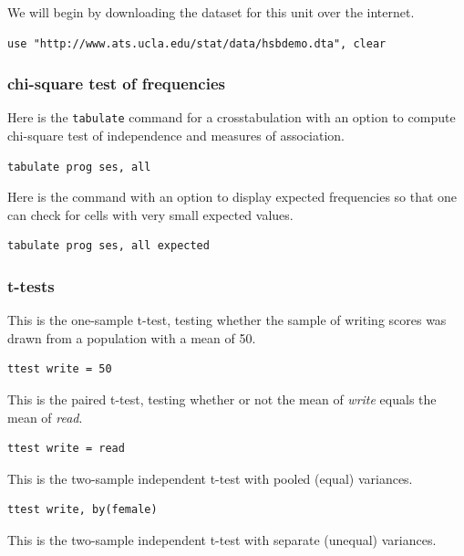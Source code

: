 \documentclass{article}
\begin{document}
We will begin by downloading the dataset for this unit over the internet.

\begin{lstlisting}
use "http://www.ats.ucla.edu/stat/data/hsbdemo.dta", clear
\end{lstlisting}

\subsubsection{chi-square test of frequencies}

Here is the \lstinline{tabulate} command for a crosstabulation with an option to compute chi-square test of independence and measures of association.


\begin{lstlisting}
tabulate prog ses, all
\end{lstlisting}

Here is the command with an option to display expected frequencies so that one can check for cells with very small expected values.

\begin{lstlisting}
tabulate prog ses, all expected
\end{lstlisting}

\subsubsection{t-tests}

This is the one-sample t-test, testing whether the sample of writing scores was drawn from a population with a mean of 50.

\begin{lstlisting}
ttest write = 50
\end{lstlisting}

This is the paired t-test, testing whether or not the mean of \textit{write} equals the mean of \textit{read}.

\begin{lstlisting}
ttest write = read
\end{lstlisting}

This is the two-sample independent t-test with pooled (equal) variances.

\begin{lstlisting}
ttest write, by(female)
\end{lstlisting}

This is the two-sample independent t-test with separate (unequal) variances.
\end{document}
